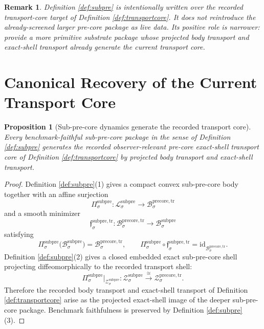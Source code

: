 \documentclass[11pt]{article}
\newcommand{\PreCoreTrBody}[1]{\mathcal B_{#1}^{\mathrm{precore,tr}}}
\newcommand{\PreCoreTrShell}[1]{\mathcal Z_{#1}^{\mathrm{precore,tr}}}
\newcommand{\SubPreCoreSpace}[1]{\mathcal L_{#1}^{\mathrm{subpre}}}
\newcommand{\SubPreCoreBody}[1]{\mathcal B_{#1}^{\mathrm{subpre}}}
\newcommand{\SubPreCoreProj}[1]{\Pi_{#1}^{\mathrm{subpre}}}
\newcommand{\SubPreCoreTransportMin}[1]{\mathfrak f_{#1}^{\mathrm{subpre,tr}}}
\newcommand{\SubPreCoreShellSet}[1]{\mathcal Z_{#1}^{\mathrm{subpre}}}
\newtheorem{proposition}{Proposition}
\newtheorem{remark}{Remark}
\begin{document}
\begin{remark}
Definition \ref{def:subpre} is intentionally written over the recorded transport-core target of Definition \ref{def:transportcore}. It does not reintroduce the already-screened larger pre-core package as live data. Its positive role is narrower: provide a more primitive substrate package whose projected body transport and exact-shell transport already generate the current transport core.
\end{remark}

\section{Canonical Recovery of the Current Transport Core}

\begin{proposition}[Sub-pre-core dynamics generate the recorded transport core]
\label{prop:core}
Every benchmark-faithful sub-pre-core package in the sense of Definition \ref{def:subpre} generates the recorded observer-relevant pre-core exact-shell transport core of Definition \ref{def:transportcore} by projected body transport and exact-shell transport.
\end{proposition}

\begin{proof}
Definition \ref{def:subpre}(1) gives a compact convex sub-pre-core body together with an affine surjection
\[
\SubPreCoreProj{\sigma}:\SubPreCoreSpace{\sigma}\to\PreCoreTrBody{\sigma}
\]
and a smooth minimizer
\[
\SubPreCoreTransportMin{\sigma}:\PreCoreTrBody{\sigma}\to\SubPreCoreBody{\sigma}
\]
satisfying
\[
\SubPreCoreProj{\sigma}\bigl(\SubPreCoreBody{\sigma}\bigr)=\PreCoreTrBody{\sigma},
\qquad
\SubPreCoreProj{\sigma}\circ\SubPreCoreTransportMin{\sigma}
=
\mathrm{id}_{\PreCoreTrBody{\sigma}}.
\]
Definition \ref{def:subpre}(2) gives a closed embedded exact sub-pre-core shell projecting diffeomorphically to the recorded transport shell:
\[
\SubPreCoreProj{\sigma}\big|_{\SubPreCoreShellSet{\sigma}}
:
\SubPreCoreShellSet{\sigma}
\xrightarrow{\cong}
\PreCoreTrShell{\sigma}.
\]
Therefore the recorded body transport and exact-shell transport of Definition \ref{def:transportcore} arise as the projected exact-shell image of the deeper sub-pre-core package. Benchmark faithfulness is preserved by Definition \ref{def:subpre}(3).
\end{proof}
\end{document}
